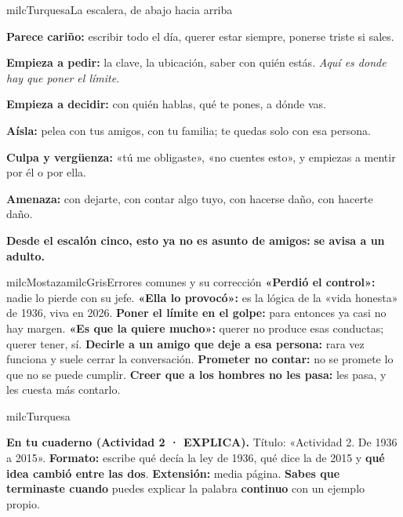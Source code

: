 \documentclass[11pt,letterpaper]{article}
\begin{document}
\begin{drawbox}{milcTurquesa}{La escalera, de abajo hacia arriba}
\begin{pasoslista}
\item \textbf{Parece cariño:} escribir todo el día, querer estar siempre, ponerse triste si sales.
\item \textbf{Empieza a pedir:} la clave, la ubicación, saber con quién estás. \emph{Aquí es donde hay que poner el límite.}
\item \textbf{Empieza a decidir:} con quién hablas, qué te pones, a dónde vas.
\item \textbf{Aísla:} pelea con tus amigos, con tu familia; te quedas solo con esa persona.
\item \textbf{Culpa y vergüenza:} «tú me obligaste», «no cuentes esto», y empiezas a mentir por él o por ella.
\item \textbf{Amenaza:} con dejarte, con contar algo tuyo, con hacerse daño, con hacerte daño.
\item \textbf{Desde el escalón cinco, esto ya no es asunto de amigos:} \textbf{se avisa a un adulto.}
\end{pasoslista}
\end{drawbox}

\begin{softbox}{milcMostaza}{milcGris}{Errores comunes y su corrección}
\textbf{«Perdió el control»:} nadie lo pierde con su jefe. \textbf{«Ella lo provocó»:} es la lógica de la «vida honesta» de 1936, viva en 2026. \textbf{Poner el límite en el golpe:} para entonces ya casi no hay margen. \textbf{«Es que la quiere mucho»:} querer no produce esas conductas; querer tener, sí. \textbf{Decirle a un amigo que deje a esa persona:} rara vez funciona y suele cerrar la conversación. \textbf{Prometer no contar:} no se promete lo que no se puede cumplir. \textbf{Creer que a los hombres no les pasa:} les pasa, y les cuesta más contarlo.
\end{softbox}

\begin{infoband}{milcTurquesa}


\textbf{En tu cuaderno (Actividad 2 · EXPLICA).} Título: «Actividad 2. De 1936 a 2015». \textbf{Formato:} escribe qué decía la ley de 1936, qué dice la de 2015 y \textbf{qué idea cambió entre las dos}. \textbf{Extensión:} media página. \textbf{Sabes que terminaste cuando} puedes explicar la palabra \textbf{continuo} con un ejemplo propio.
\end{infoband}
\end{document}

